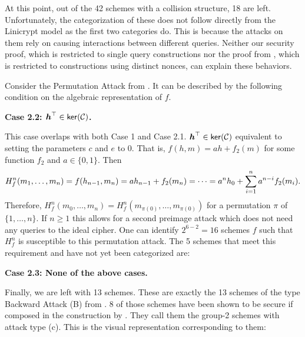 At this point, out of the 42 schemes with a collision structure, 18 are left.
Unfortunately, the categorization of these does not follow directly from the Linicrypt model as the first two categories do.
This is because the attacks on them rely on causing interactions between different queries.
Neither our security proof, which is restricted to single query constructions
nor the proof from \cite[Theorem 1]{TCC:McQSwoRos19}, which is restricted to constructions using distinct nonces,
can explain these behaviors.

Consider the Permutation Attack from \cite{C:PreGovVan93}.
It can be described by the following condition on the algebraic representation of $f$.

\textbf{Case 2.2: $\boldsymbol h^\top \in \mathsf{ker}(\mathcal{C})$.}

This case overlaps with both Case 1 and Case 2.1.
$\boldsymbol h^\top \in \mathsf{ker}(\mathcal{C})$ equivalent to setting the parameters $c$ and $e$ to 0.
That is, $f(h,m) = ah + f_2(m)$ for some function $f_2$ and $a \in \{0,1\}$.
Then 
\[
H^n_f(m_1, \dots, m_{n}) = f(h_{n-1}, m_n) = a h_{n-1} + f_2(m_n) = \cdots = a^n h_{0} + \sum_{i=1}^n a^{n-i}f_2(m_i).
\]
Therefore, $H^n_f(m_0, \dots, m_n) = H^n_f(m_{\pi(0)}, \dots, m_{\pi(0)})$ for a permutation $\pi$ of $\{1, \dots, n\}$.
If $n \geq 1$ this allows for a second preimage attack which does not need any queries to the ideal cipher.
One can identify $2^{6-2} = 16$ schemes $f$ such that $H^n_f$ is susceptible to this permutation attack.
The 5 schemes that meet this requirement and have not yet been categorized are:
\begin{center}
\end{center}

\textbf{Case 2.3: None of the above cases.}

Finally, we are left with 13 schemes.
These are exactly the 13 schemes of the type Backward Attack (B) from \cite{C:PreGovVan93}.
8 of those schemes have been shown to be secure if composed in the \MD construction by \cite{C:BlaRogShr02}.
They call them the group-2 schemes with attack type (c).
This is the visual representation corresponding to them:
\begin{center}
\end{center}



